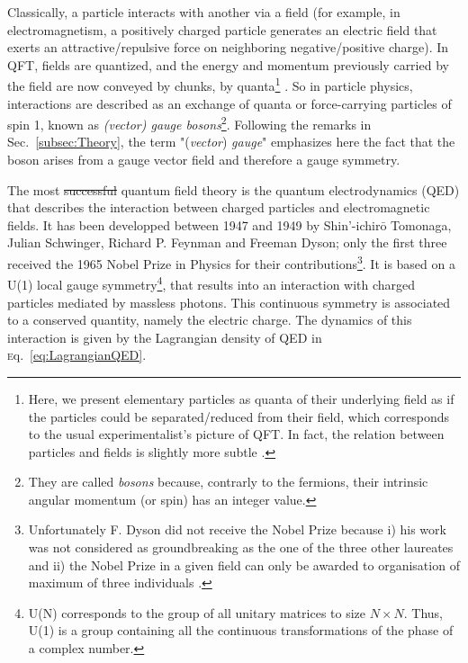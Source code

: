 \documentclass[ALICE,manyauthors]{cernphprep}
\newcommand{\eq}        {\textsc{e}q.~}
\newcommand{\Sec}       {\textsc{S}ec.~}
\providecommand{\DIFaddtex}[1]{{\protect\color{blue}\uwave{#1}}} %
\providecommand{\DIFdeltex}[1]{{\protect\color{red}\sout{#1}}}                      %
\providecommand{\DIFaddbegin}{} %
\providecommand{\DIFaddend}{} %
\providecommand{\DIFdelbegin}{} %
\providecommand{\DIFdelend}{} %
\providecommand{\DIFadd}[1]{\texorpdfstring{\DIFaddtex{#1}}{#1}} %
\providecommand{\DIFdel}[1]{\texorpdfstring{\DIFdeltex{#1}}{}} %
\newcommand{\DIFscaledelfig}{0.5}
\newlength{\DIFdelgraphicswidth} %
\newlength{\DIFdelgraphicsheight} %
\newcommand{\DIFaddincludegraphics}[2][]{{\color{blue}\fbox{\DIFOincludegraphics[#1]{#2}}}} %
\newcommand{\DIFdelincludegraphics}[2][]{%
\sbox{\DIFdelgraphicsbox}{\DIFOincludegraphics[#1]{#2}}%
\settoboxwidth{\DIFdelgraphicswidth}{\DIFdelgraphicsbox} %
\settoboxtotalheight{\DIFdelgraphicsheight}{\DIFdelgraphicsbox} %
\scalebox{\DIFscaledelfig}{%
\parbox[b]{\DIFdelgraphicswidth}{\usebox{\DIFdelgraphicsbox}\\[-\baselineskip] \rule{\DIFdelgraphicswidth}{0em}}\llap{\resizebox{\DIFdelgraphicswidth}{\DIFdelgraphicsheight}{%
\setlength{\unitlength}{\DIFdelgraphicswidth}%
\begin{picture}(1,1)%
\thicklines\linethickness{2pt} %
{\color[rgb]{1,0,0}\put(0,0){\framebox(1,1){}}}%
{\color[rgb]{1,0,0}\put(0,0){\line( 1,1){1}}}%
{\color[rgb]{1,0,0}\put(0,1){\line(1,-1){1}}}%
\end{picture}%
}\hspace*{3pt}}} %
} %
\DeclareRobustCommand{\DIFaddbegin}{\DIFOaddbegin \let\includegraphics\DIFaddincludegraphics} %
\DeclareRobustCommand{\DIFaddend}{\DIFOaddend \let\includegraphics\DIFOincludegraphics} %
\DeclareRobustCommand{\DIFdelbegin}{\DIFOdelbegin \let\includegraphics\DIFdelincludegraphics} %
\DeclareRobustCommand{\DIFdelend}{\DIFOaddend \let\includegraphics\DIFOincludegraphics} %
\begin{document}
Classically, a particle interacts with another via a field (for example, in electromagnetism, a positively charged particle generates an electric field that exerts an attractive/repulsive force on neighboring negative/positive charge). In QFT, fields are quantized, and the energy and momentum previously carried by the field are now conveyed by chunks, by quanta\footnote{Here, we present elementary particles as quanta  of their underlying field as if the particles could be separated/reduced from their field, which corresponds to the usual experimentalist's picture of QFT. In fact, the relation between particles and fields is slightly more subtle \cite{jaegerElementaryParticlesQuantum2021}.} \cite{serwayModernPhysics2004}. So in particle physics, interactions are described as an exchange of quanta or force-carrying particles of spin 1, known as \textit{(vector) gauge bosons}\footnote{They are called \textit{bosons} because, contrarly to the fermions, their intrinsic angular momentum (or spin) has an integer value.}\cite{braibantParticlesFundamentalInteractions2012}\cite{thomsonModernParticlePhysics2013}. Following the remarks in \Sec\ref{subsec:Theory}, the term "(\textit{vector}) \textit{gauge}" emphasizes here the fact that the boson arises from a gauge vector field and therefore a gauge symmetry. 

The most \DIFdelbegin \DIFdel{successful }\DIFdelend \DIFaddbegin \DIFadd{precise }\DIFaddend quantum field theory is the quantum electrodynamics (QED) that describes the interaction between charged particles and electromagnetic fields. It has been developped between 1947 and 1949 by Shin'-ichir$\bar{\text{o}}$ Tomonaga, Julian Schwinger, Richard P. Feynman and Freeman Dyson; only the first three received the 1965 Nobel Prize in Physics for their contributions\footnote{Unfortunately F. Dyson did not receive the Nobel Prize because i) his work was not considered as groundbreaking as the one of the three other laureates and ii) the Nobel Prize in a given field can only be awarded to organisation of maximum of three individuals \cite{schmidhuberEvolutionNationalNobel2010}.}. It is based on a U(1) local gauge symmetry\footnote{U(N) corresponds to the group of all unitary matrices to size $N \times N$. Thus, U(1) is a group containing all the continuous transformations of the phase of a complex number.}, that results into an interaction with charged particles mediated by massless photons. This continuous symmetry is associated to a conserved quantity, namely the electric charge. The dynamics of this interaction is given by the Lagrangian density of QED in \eq\ref{eq:LagrangianQED}.
\end{document}
